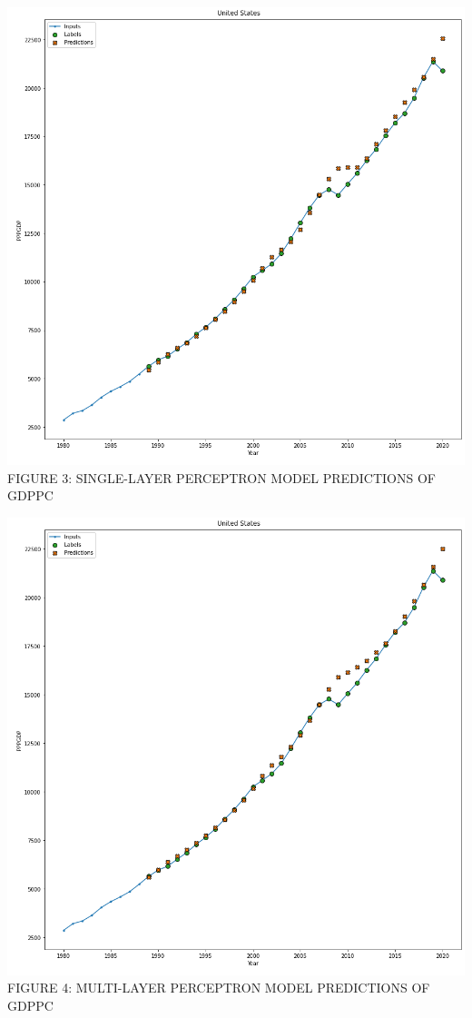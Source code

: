 \documentclass[final]{cvpr}
\begin{document}
\begin{center}
        \includegraphics[scale=0.27]{images/singleFiller.png}
        {\small
            FIGURE 3: SINGLE-LAYER PERCEPTRON MODEL PREDICTIONS OF GDPPC
        }

        \includegraphics[scale=0.27]{images/multiFiller.png}
        {\small
            FIGURE 4: MULTI-LAYER PERCEPTRON MODEL PREDICTIONS OF GDPPC
        }


\end{center}
\end{document}
